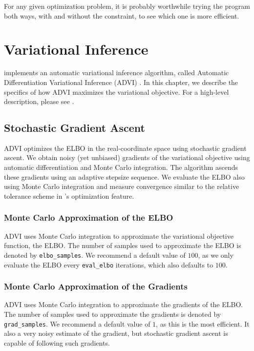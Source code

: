 For any given optimization problem, it is probably worthwhile trying
the program both ways, with and without the constraint, to see which
one is more efficient.


\chapter{Variational Inference}\label{vi-algorithms.chapter}

\noindent
\Stan implements an automatic variational inference algorithm, called
Automatic Differentiation Variational Inference (ADVI)
\citep{Kucukelbir:2015}. In this chapter, we describe the specifics of how ADVI
maximizes the variational objective. For a high-level description, please see
.

\section{Stochastic Gradient Ascent}

ADVI optimizes the ELBO in the real-coordinate space using stochastic gradient
ascent. We obtain noisy (yet unbiased) gradients of the variational objective
using automatic differentiation and Monte Carlo integration. The algorithm
ascends these gradients using an adaptive stepsize sequence. We evaluate the
ELBO also using Monte Carlo integration and measure convergence similar to the
relative tolerance scheme in \Stan's optimization feature.

\subsection{Monte Carlo Approximation of the ELBO}

ADVI uses Monte Carlo integration to approximate the variational objective
function, the ELBO. The number of samples used to approximate the ELBO is
denoted by \texttt{elbo\_samples}. We recommend a default value of $100$, as we
only evaluate the ELBO every \texttt{eval\_elbo} iterations, which also defaults
to $100$.

\subsection{Monte Carlo Approximation of the Gradients}

ADVI uses Monte Carlo integration to approximate the gradients of the ELBO. The
number of samples used to approximate the gradients is denoted by
\texttt{grad\_samples}. We recommend a default value of $1$, as this is the most
efficient. It also a very noisy estimate of the gradient, but stochastic
gradient ascent is capable of following such gradients.

